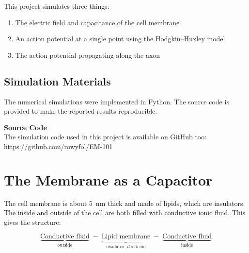 \documentclass[12pt, a4paper]{article}
\begin{document}
This project simulates three things:
\begin{enumerate}[leftmargin=*, itemsep=2pt]
  \item The electric field and capacitance of the cell membrane
  \item An action potential at a single point using the
        Hodgkin--Huxley model
  \item The action potential propagating along the axon
\end{enumerate}

\subsection*{Simulation Materials}

The numerical simulations were implemented in Python. The source code
is provided to make the reported results reproducible.

\begin{tcolorbox}[
  enhanced,
  colback=white,
  colframe=myborder,
  boxrule=1pt, arc=5pt,
  left=12pt, right=12pt, top=8pt, bottom=8pt,
]
  \begin{minipage}[c]{0.72\linewidth}
    {\small\bfseries\color{myblue} Source Code}\\
    {\small\color{mygray} The simulation code used in this project
    is available on GitHub too:}\\
    [4pt]
    {\small\ttfamily\color{mydarkblue}
      https://github.com/rowyfol/EM-101}
  \end{minipage}%
  \hfill
  \begin{minipage}[c]{0.22\linewidth}
    \centering
  \end{minipage}
\end{tcolorbox}

\section{The Membrane as a Capacitor}

The cell membrane is about 5~nm thick and made of lipids, which are
insulators. The inside and outside of the cell are both filled with
conductive ionic fluid. This gives the structure:

\[
  \underbrace{\text{Conductive fluid}}_{\text{outside}}
  \;-\;
  \underbrace{\text{Lipid membrane}}_{\text{insulator, } d \approx 5\,\text{nm}}
  \;-\;
  \underbrace{\text{Conductive fluid}}_{\text{inside}}
\]
\end{document}
